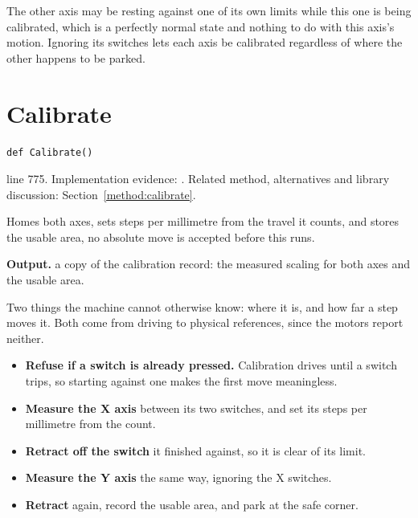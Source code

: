 The other axis may be resting against one of its own limits while this one is being calibrated, which is a perfectly normal state and nothing to do with this axis's motion. Ignoring its switches lets each axis be calibrated regardless of where the other happens to be parked.



\section{Calibrate}\label{fn:reproduce:Calibrate}
\begin{lstlisting}[style=sig]
def Calibrate()
\end{lstlisting}
 line 775. Implementation evidence: \cite{code2026}. Related method, alternatives and library discussion: Section~\ref{method:calibrate}.


Homes both axes, sets steps per millimetre from the travel it counts, and stores the usable area, no absolute move is accepted before this runs.




\noindent\textbf{Output.} a copy of the calibration record: the measured scaling for both axes and the usable area.


Two things the machine cannot otherwise know: where it is, and how far a step moves it. Both come from driving to physical references, since the motors report neither.



\begin{itemize}\setlength\itemsep{0pt}
  \item \textbf{Refuse if a switch is already pressed.} Calibration drives until a switch trips, so starting against one makes the first move meaningless.
  \item \textbf{Measure the X axis} between its two switches, and set its steps per millimetre from the count.
  \item \textbf{Retract off the switch} it finished against, so it is clear of its limit.
  \item \textbf{Measure the Y axis} the same way, ignoring the X switches.
  \item \textbf{Retract} again, record the usable area, and park at the safe corner.
\end{itemize}

